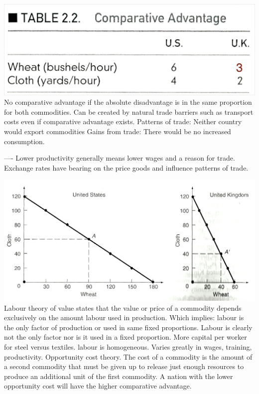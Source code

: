\documentclass[12pt]{examnotes}
\begin{document}
\includegraphics[scale=0.2]{./imgs/t23.jpg}
\ra No comparative advantage if the absolute disadvantage is in the same proportion for both commodities.
\ra Can be created by natural trade barriers such as transport costs even if comparative advantage exists. 
\ra Patterns of trade: Neither country would export commodities
\ra Gains from trade: There would be no increased consumption.

----
\ra Lower productivity generally means lower wages and a reason for trade.
\ra Exchange rates have bearing on the price goods and influence patterns of trade.

\includegraphics[scale=0.4]{./imgs/21.jpg}
\ra Labour theory of value states that the value or price of a commodity depends exclusively on the amount labour used in production. Which implies:  
 labour is the only factor of production or used in same fixed proportions. Labour is clearly not the only factor nor is it used in a fixed proportion. More capital per worker for steel versus textiles. 
 labour is homogeneous. Varies greatly in wages, training, productivity.
\ra Opportunity cost theory. The cost of a commodity is the amount of a second commodity that must be given up to release just enough resources to produce an additional unit of the first commodity.
\ra A nation with the lower opportunity cost will have the higher comparative advantage.
\end{document}

